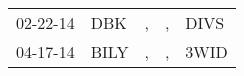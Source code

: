 \begin{supertabular}{lllll}
 02-22-14 &   DBK &  , &  , &  DIVS \\
 04-17-14 &  BILY &  , &  , &  3WID \\
\end{supertabular}
